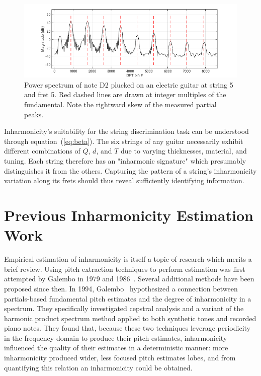\documentclass[12pt]{cmuthesis}
\begin{document}
\begin{figure}[!htbp]
\label{fig:skew}
\centering
\includegraphics[scale=0.65]{skew}
\caption{Power spectrum of note D2 plucked on an electric guitar at string 5 and fret 5. Red dashed lines are drawn at integer multiples of the fundamental. Note the rightward skew of the measured partial peaks.}
\end{figure}

Inharmonicity's suitability for the string discrimination task can be understood through equation~(\ref{eq:beta}). The six strings of any guitar necessarily exhibit different combinations of $Q$, $d$, and $T$ due to varying thicknesses, material, and tuning. Each string therefore has an "inharmonic signature" which presumably distinguishes it from the others. Capturing the pattern of a string's inharmonicity variation along its frets should thus reveal sufficiently identifying information.

\section{Previous Inharmonicity Estimation Work}
\label{lit-beta-est}
Empirical estimation of inharmonicity is itself a topic of research which merits a brief review. Using pitch extraction techniques to perform estimation was first attempted by Galembo in 1979 and 1986~\cite{galembo1979,galembo1987}. Several additional methods have been proposed since then. In 1994, Galembo~\cite{galembo1994} hypothesized a connection between partials-based fundamental pitch estimates and the degree of inharmonicity in a spectrum. They specifically investigated cepstral analysis and a variant of the harmonic product spectrum method applied to both synthetic tones and recorded piano notes. They found that, because these two techniques leverage periodicity in the frequency domain to produce their pitch estimates, inharmonicity influenced the quality of their estimates in a deterministic manner: more inharmonicity produced wider, less focused pitch estimates lobes, and from quantifying this relation an inharmonicity could be obtained.
 
\end{document}
